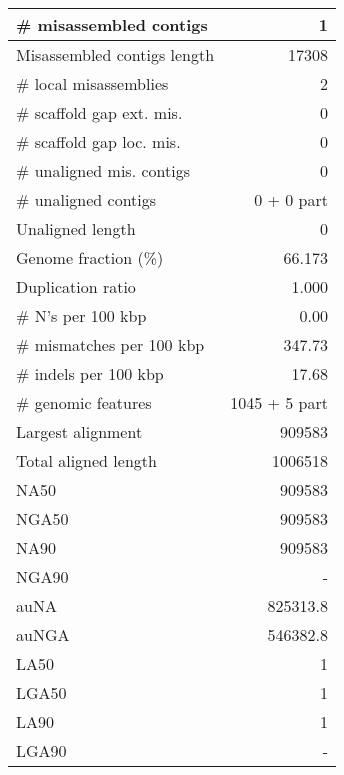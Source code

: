 \documentclass[12pt,a4paper]{article}
\begin{document}
\begin{table}[ht]
\begin{center}
\begin{tabular}{|l*{1}{|r}|}
\# misassembled contigs & 1 \\ \hline
Misassembled contigs length & 17308 \\ \hline
\# local misassemblies & 2 \\ \hline
\# scaffold gap ext. mis. & 0 \\ \hline
\# scaffold gap loc. mis. & 0 \\ \hline
\# unaligned mis. contigs & 0 \\ \hline
\# unaligned contigs & 0 + 0 part \\ \hline
Unaligned length & 0 \\ \hline
Genome fraction (\%) & 66.173 \\ \hline
Duplication ratio & 1.000 \\ \hline
\# N's per 100 kbp & 0.00 \\ \hline
\# mismatches per 100 kbp & 347.73 \\ \hline
\# indels per 100 kbp & 17.68 \\ \hline
\# genomic features & 1045 + 5 part \\ \hline
Largest alignment & 909583 \\ \hline
Total aligned length & 1006518 \\ \hline
NA50 & 909583 \\ \hline
NGA50 & 909583 \\ \hline
NA90 & 909583 \\ \hline
NGA90 & - \\ \hline
auNA & 825313.8 \\ \hline
auNGA & 546382.8 \\ \hline
LA50 & 1 \\ \hline
LGA50 & 1 \\ \hline
LA90 & 1 \\ \hline
LGA90 & - \\ \hline
\end{tabular}
\end{center}
\end{table}
\end{document}
